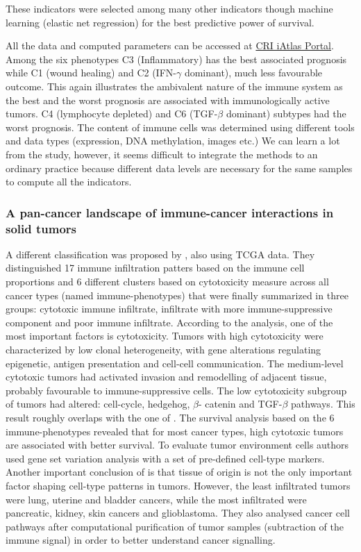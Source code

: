 \documentclass[12pt,]{book}
\theoremstyle{definition}
\theoremstyle{definition}
\theoremstyle{definition}
\theoremstyle{remark}
\begin{document}
These indicators were selected among many other indicators though
machine learning (elastic net regression) for the best predictive power
of survival.

All the data and computed parameters can be accessed at
\href{https://isb-cgc.shinyapps.io/shiny-iatlas/}{CRI iAtlas Portal}.
Among the six phenotypes C3 (Inflammatory) has the best associated
prognosis while C1 (wound healing) and C2 (IFN-\(\gamma\) dominant),
much less favourable outcome. This again illustrates the ambivalent
nature of the immune system as the best and the worst prognosis are
associated with immunologically active tumors. C4 (lymphocyte depleted)
and C6 (TGF-\(\beta\) dominant) subtypes had the worst prognosis. The
content of immune cells was determined using different tools and data
types (expression, DNA methylation, images etc.) We can learn a lot from
the study, however, it seems difficult to integrate the methods to an
ordinary practice because different data levels are necessary for the
same samples to compute all the indicators.

\hypertarget{a-pan-cancer-landscape-of-immune-cancer-interactions-in-solid-tumors}{%
\subsubsection{A pan-cancer landscape of immune-cancer interactions in
solid
tumors}\label{a-pan-cancer-landscape-of-immune-cancer-interactions-in-solid-tumors}}

A different classification was proposed by \citet{Tamborero2018}, also
using TCGA data. They distinguished 17 immune infiltration patters based
on the immune cell proportions and 6 different clusters based on
cytotoxicity measure across all cancer types (named immune-phenotypes)
that were finally summarized in three groups: cytotoxic immune
infiltrate, infiltrate with more immune-suppressive component and poor
immune infiltrate. According to the analysis, one of the most important
factors is cytotoxicity. Tumors with high cytotoxicity were
characterized by low clonal heterogeneity, with gene alterations
regulating epigenetic, antigen presentation and cell-cell communication.
The medium-level cytotoxic tumors had activated invasion and remodelling
of adjacent tissue, probably favourable to immune-suppressive cells. The
low cytotoxicity subgroup of tumors had altered: cell-cycle, hedgehog,
\(\beta\)- catenin and TGF-\(\beta\) pathways. This result roughly
overlaps with the one of \citet{Thorsson2018}. The survival analysis
based on the 6 immune-phenotypes revealed that for most cancer types,
high cytotoxic tumors are associated with better survival. To evaluate
tumor environment cells authors used gene set variation analysis
\citep{Hanzelmann2013} with a set of pre-defined cell-type markers.
Another important conclusion of \citet{Tamborero2018} is that tissue of
origin is not the only important factor shaping cell-type patterns in
tumors. However, the least infiltrated tumors were lung, uterine and
bladder cancers, while the most infiltrated were pancreatic, kidney,
skin cancers and glioblastoma. They also analysed cancer cell pathways
after computational purification of tumor samples (subtraction of the
immune signal) in order to better understand cancer signalling.
\end{document}
